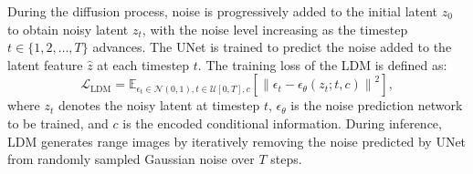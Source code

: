 During the diffusion process, noise is progressively added to the initial latent \( z_{0} \) to obtain noisy latent \( z_{t} \), with the noise level increasing as the timestep \( t \in \{1, 2, \ldots, T\} \) advances.
The UNet is trained to predict the noise added to the latent feature \( \hat{z} \) at each timestep \( t \).
The training loss of the LDM is defined as:
\begin{equation}
\label{ldm_loss}
\mathcal{L}_{\text{LDM}}=\mathbb{E}_{\epsilon_{t} \in \mathcal{N}(0,1), t \in \mathcal{U}[0, T], c}\left[\left\| \epsilon_{t}-\epsilon_{\theta}\left(z_{t} ; t, c\right)\right\| ^{2}\right],
\end{equation}
where \( z_{t} \) denotes the noisy latent at timestep \( t \), \( \epsilon_{\theta} \) is the noise prediction network to be trained, and \( c \) is the encoded conditional information.
During inference, LDM generates range images by iteratively removing the noise predicted by UNet from randomly sampled Gaussian noise over \( T \) steps.

